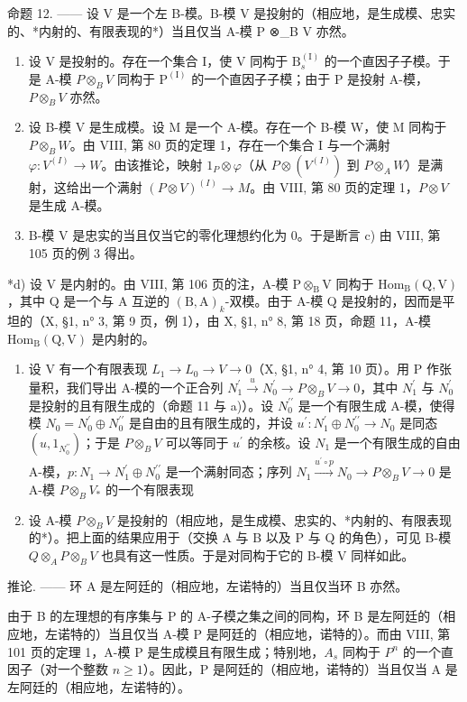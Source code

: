 命题 12. —— 设 V 是一个左 B-模。B-模 V 是投射的（相应地，是生成模、忠实的、*内射的、有限表现的*）当且仅当 A-模 P ⊗\_B V 亦然。

\begin{enumerate}
\def\labelenumi{\alph{enumi})}
\item
  设 V 是投射的。存在一个集合 I，使 V 同构于 \(\mathrm{B}_{s}^{(\mathrm{I})}\) 的一个直因子子模。于是 A-模 \(P \otimes_{B} V\) 同构于 \(\mathrm{P}^{(\mathrm{I})}\) 的一个直因子子模；由于 P 是投射 A-模，\(P \otimes_{B} V\) 亦然。
\item
  设 B-模 V 是生成模。设 M 是一个 A-模。存在一个 B-模 W，使 M 同构于 \(P \otimes_{B} W\)。由 VIII, 第 80 页的定理 1，存在一个集合 I 与一个满射 \(\varphi : V^{(I)} \to W\)。由该推论，映射 \(1_{P} \otimes \varphi\)（从 \(P \otimes (V^{(I)})\) 到 \(P \otimes_{A} W\)）是满射，这给出一个满射 \((P \otimes V)^{(I)} \to M\)。由 VIII, 第 80 页的定理 1，\(P \otimes V\) 是生成 A-模。
\item
  B-模 V 是忠实的当且仅当它的零化理想约化为 0。于是断言 c) 由 VIII, 第 105 页的例 3 得出。
\end{enumerate}

*d) 设 V 是内射的。由 VIII, 第 106 页的注，A-模 \(\mathrm{P} \otimes_{\mathrm{B}} \mathrm{V}\) 同构于 \(\mathrm{Hom}_{\mathrm{B}}(\mathrm{Q}, \mathrm{V})\)，其中 Q 是一个与 A 互逆的 \((\mathrm{B}, \mathrm{A})_k\)-双模。由于 A-模 Q 是投射的，因而是平坦的（X, §1, n° 3, 第 9 页，例 1），由 X, §1, n° 8, 第 18 页，命题 11，A-模 \(\mathrm{Hom}_{\mathrm{B}}(\mathrm{Q}, \mathrm{V})\) 是内射的。

\begin{enumerate}
\def\labelenumi{\alph{enumi})}
\setcounter{enumi}{4}
\item
  设 V 有一个有限表现 \(L_{1} \to L_{0} \to V \to 0\)（X, §1, n° 4, 第 10 页）。用 P 作张量积，我们导出 A-模的一个正合列 \(N_{1}^{\prime} \xrightarrow{u} N_{0}^{\prime} \to P \otimes_{B} V \to 0\)，其中 \(N_{1}^{\prime}\) 与 \(N_{0}^{\prime}\) 是投射的且有限生成的（命题 11 与 a)）。设 \(N_{0}^{\prime\prime}\) 是一个有限生成 A-模，使得模 \(N_{0} = N_{0}^{\prime} \oplus N_{0}^{\prime\prime}\) 是自由的且有限生成的，并设 \(u^{\prime}: N_{1}^{\prime} \oplus N_{0}^{\prime\prime} \to N_{0}\) 是同态 \((u, 1_{N_{0}^{\prime\prime}})\)；于是 \(P \otimes_{B} V\) 可以等同于 \(u^{\prime}\) 的余核。设 \(N_{1}\) 是一个有限生成的自由 A-模，\(p: N_{1} \to N_{1}^{\prime} \oplus N_{0}^{\prime\prime}\) 是一个满射同态；序列 \(N_{1} \xrightarrow{u^{\prime} \circ p} N_{0} \to P \otimes_{B} V \to 0\) 是 A-模 \(P \otimes_{B} V_*\) 的一个有限表现
\item
  设 A-模 \(P \otimes_{B} V\) 是投射的（相应地，是生成模、忠实的、*内射的、有限表现的*）。把上面的结果应用于（交换 A 与 B 以及 P 与 Q 的角色），可见 B-模 \(Q \otimes_{A} P \otimes_{B} V\) 也具有这一性质。于是对同构于它的 B-模 V 同样如此。
\end{enumerate}

推论. —— 环 A 是左阿廷的（相应地，左诺特的）当且仅当环 B 亦然。

由于 B 的左理想的有序集与 P 的 A-子模之集之间的同构，环 B 是左阿廷的（相应地，左诺特的）当且仅当 A-模 P 是阿廷的（相应地，诺特的）。而由 VIII, 第 101 页的定理 1，A-模 P 是生成模且有限生成；特别地，\(A_{s}\) 同构于 \(P^{n}\) 的一个直因子（对一个整数 \(n \geqslant 1\)）。因此，P 是阿廷的（相应地，诺特的）当且仅当 A 是左阿廷的（相应地，左诺特的）。

